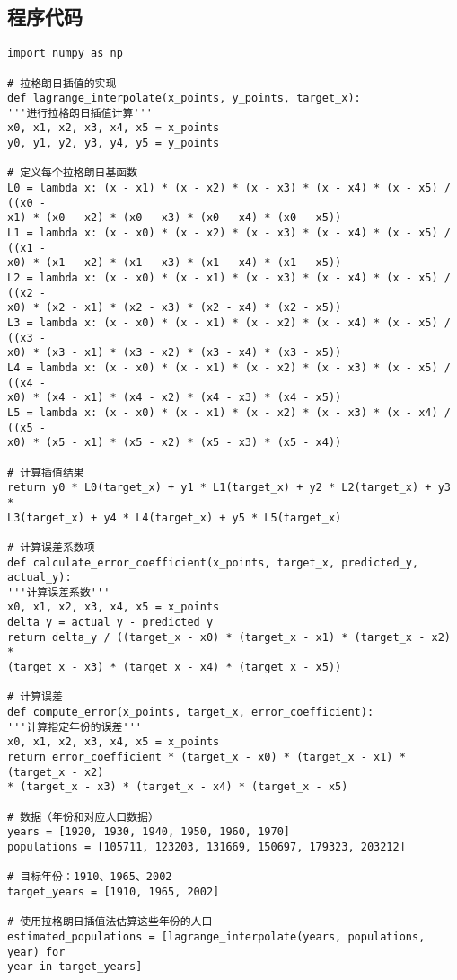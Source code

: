 \documentclass[b5paper;twoside]{article}
\begin{document}
\subsection{程序代码}

\begin{lstlisting}
import numpy as np

# 拉格朗日插值的实现
def lagrange_interpolate(x_points, y_points, target_x):
'''进行拉格朗日插值计算'''
x0, x1, x2, x3, x4, x5 = x_points
y0, y1, y2, y3, y4, y5 = y_points

# 定义每个拉格朗日基函数
L0 = lambda x: (x - x1) * (x - x2) * (x - x3) * (x - x4) * (x - x5) / ((x0 - 
x1) * (x0 - x2) * (x0 - x3) * (x0 - x4) * (x0 - x5))
L1 = lambda x: (x - x0) * (x - x2) * (x - x3) * (x - x4) * (x - x5) / ((x1 - 
x0) * (x1 - x2) * (x1 - x3) * (x1 - x4) * (x1 - x5))
L2 = lambda x: (x - x0) * (x - x1) * (x - x3) * (x - x4) * (x - x5) / ((x2 - 
x0) * (x2 - x1) * (x2 - x3) * (x2 - x4) * (x2 - x5))
L3 = lambda x: (x - x0) * (x - x1) * (x - x2) * (x - x4) * (x - x5) / ((x3 - 
x0) * (x3 - x1) * (x3 - x2) * (x3 - x4) * (x3 - x5))
L4 = lambda x: (x - x0) * (x - x1) * (x - x2) * (x - x3) * (x - x5) / ((x4 - 
x0) * (x4 - x1) * (x4 - x2) * (x4 - x3) * (x4 - x5))
L5 = lambda x: (x - x0) * (x - x1) * (x - x2) * (x - x3) * (x - x4) / ((x5 - 
x0) * (x5 - x1) * (x5 - x2) * (x5 - x3) * (x5 - x4))

# 计算插值结果
return y0 * L0(target_x) + y1 * L1(target_x) + y2 * L2(target_x) + y3 * 
L3(target_x) + y4 * L4(target_x) + y5 * L5(target_x)

# 计算误差系数项
def calculate_error_coefficient(x_points, target_x, predicted_y, actual_y):
'''计算误差系数'''
x0, x1, x2, x3, x4, x5 = x_points
delta_y = actual_y - predicted_y
return delta_y / ((target_x - x0) * (target_x - x1) * (target_x - x2) * 
(target_x - x3) * (target_x - x4) * (target_x - x5))

# 计算误差
def compute_error(x_points, target_x, error_coefficient):
'''计算指定年份的误差'''
x0, x1, x2, x3, x4, x5 = x_points
return error_coefficient * (target_x - x0) * (target_x - x1) * (target_x - x2) 
* (target_x - x3) * (target_x - x4) * (target_x - x5)

# 数据（年份和对应人口数据）
years = [1920, 1930, 1940, 1950, 1960, 1970]
populations = [105711, 123203, 131669, 150697, 179323, 203212]

# 目标年份：1910、1965、2002
target_years = [1910, 1965, 2002]

# 使用拉格朗日插值法估算这些年份的人口
estimated_populations = [lagrange_interpolate(years, populations, year) for 
year in target_years]


\end{lstlisting}
\end{document}
